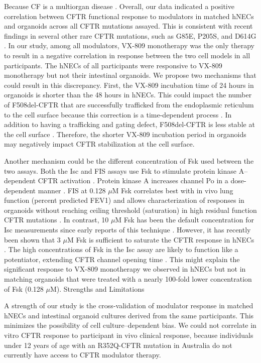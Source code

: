 Because CF is a multiorgan disease \cite{ratjen2015}. Overall, our data indicated a positive correlation between CFTR functional response to modulators in matched hNECs and organoids across all CFTR mutations assayed. This is consistent with recent findings in several other rare CFTR mutations, such as G85E, P205S, and D614G \cite{silva2021}. In our study, among all modulators, VX-809 monotherapy was the only therapy to result in a negative correlation in response between the two cell models in all participants. The hNECs of all participants were responsive to VX-809 monotherapy but not their intestinal organoids. We propose two mechanisms that could result in this discrepancy. First, the VX-809 incubation time of 24 hours in organoids is shorter than the 48 hours in hNECs. This could impact the number of F508del-CFTR that are successfully trafficked from the endoplasmic reticulum to the cell surface because this correction is a time-dependent process \cite{jurkuvenaite2010}. In addition to having a trafficking and gating defect, F508del-CFTR is less stable at the cell surface \cite{gentzsch2004}. Therefore, the shorter VX-809 incubation period in organoids may negatively impact CFTR stabilization at the cell surface.

Another mechanism could be the different concentration of Fsk used between the two assays. Both the Isc and FIS assays use Fsk to stimulate protein kinase A–dependent CFTR activation \cite{dekkers2013, gentzsch2017}. Protein kinase A increases channel Po in a dose-dependent manner \cite{cui2019}. FIS at 0.128 $\mu$M Fsk correlates best with in vivo lung function (percent predicted FEV1) and allows characterization of responses in organoids without reaching ceiling threshold (saturation) in high residual function CFTR mutations \cite{dekkers2016}. In contrast, 10 $\mu$M Fsk has been the default concentration for Isc measurements since early reports of this technique \cite{blouquit2002, smith1993}. However, it has recently been shown that 3 $\mu$M Fsk is sufficient to saturate the CFTR response in hNECs \cite{avramescu2017}. The high concentrations of Fsk in the Isc assay are likely to function like a potentiator, extending CFTR channel opening time \cite{cui2019}. This might explain the significant response to VX-809 monotherapy we observed in hNECs but not in matching organoids that were treated with a nearly 100-fold lower concentration of Fsk (0.128 $\mu$M).
Strengths and Limitations

A strength of our study is the cross-validation of modulator response in matched hNECs and intestinal organoid cultures derived from the same participants. This minimizes the possibility of cell culture–dependent bias. We could not correlate in vitro CFTR response to participant in vivo clinical response, because individuals under 12 years of age with an R352Q-CFTR mutation in Australia do not currently have access to CFTR modulator therapy.

